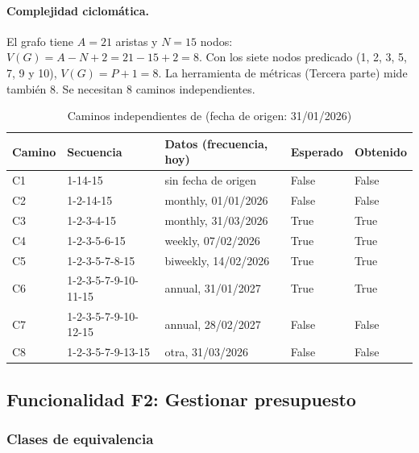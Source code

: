 \paragraph{Complejidad ciclomática.} El grafo tiene $A = 21$ aristas y $N = 15$ nodos: $V(G) = A - N + 2 = 21 - 15 + 2 = 8$. Con los siete nodos predicado (1, 2, 3, 5, 7, 9 y 10), $V(G) = P + 1 = 8$. La herramienta de métricas (Tercera parte) mide también 8. Se necesitan 8 caminos independientes.

\begin{table}[H]
\caption{Caminos independientes de  (fecha de origen: 31/01/2026)}
\label{tab:caminos-toca}
\footnotesize
\begin{tabularx}{\linewidth}{L{0.8cm} L{3.3cm} L{3.4cm} L{1.4cm} Y}
\toprule
Camino & Secuencia & Datos (frecuencia, hoy) & Esperado & Obtenido \\
\midrule
C1 & 1-14-15 & sin fecha de origen & False & False \\
C2 & 1-2-14-15 & monthly, 01/01/2026 & False & False \\
C3 & 1-2-3-4-15 & monthly, 31/03/2026 & True & True \\
C4 & 1-2-3-5-6-15 & weekly, 07/02/2026 & True & True \\
C5 & 1-2-3-5-7-8-15 & biweekly, 14/02/2026 & True & True \\
C6 & 1-2-3-5-7-9-10-11-15 & annual, 31/01/2027 & True & True \\
C7 & 1-2-3-5-7-9-10-12-15 & annual, 28/02/2027 & False & False \\
C8 & 1-2-3-5-7-9-13-15 & otra, 31/03/2026 & False & False \\
\bottomrule
\end{tabularx}
\end{table}

\subsection{Funcionalidad F2: Gestionar presupuesto}

\subsubsection{Clases de equivalencia}

